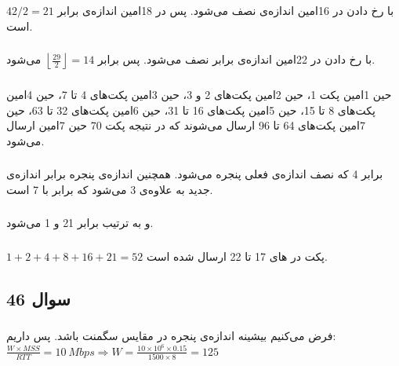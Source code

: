 \documentclass{article}
\begin{document}
\subsubsection{}
با رخ دادن  در 16امین  اندازه‌ی  نصف می‌شود. پس در 18امین  اندازه‌ی  برابر $42/2=21$ است.
\subsubsection{}
با رخ دادن  در 22امین  اندازه‌ی  برابر نصف   می‌شود. پس  برابر 
$\left\lfloor \frac{29}{2} \right\rfloor = 14$
می‌شود.
\subsubsection{}
حین 1امین  پکت 1، حین 2امین  پکت‌های 2 و 3،  حین 3امین  پکت‌های 4 تا 7، حین 4امین  پکت‌های 8 تا 15، حین 5امین  پکت‌های 16 تا 31، حین 6امین  پکت‌های 32 تا 63، حین 7امین  پکت‌های 64 تا 96 ارسال می‌شوند که در نتیجه پکت 70 حین 7امین  ارسال می‌شود.
\subsubsection{}
 برابر 4 که نصف اندازه‌ی فعلی پنجره می‌شود. همچنین اندازه‌ی پنجره برابر اندازه‌ی جدید  به علاوه‌ی 3 می‌شود که برابر با 7 است.
\subsubsection{}
 و  به ترتیب برابر 21 و 1 می‌شود.
\subsubsection{}
$
1+2+4+8+16+21=52
$
پکت در های 17 تا 22 ارسال شده است.


\subsection{سوال 46}
\subsubsection{}
فرض می‌کنیم  بیشینه اندازه‌ی پنجره در مقایس سگمنت باشد. پس داریم:
$
\frac{W\times MSS}{RTT} = 10\:Mbps\Rightarrow W = \frac{10\times 10^6\times 0.15}{1500\times 8} = 125
$
\end{document}
